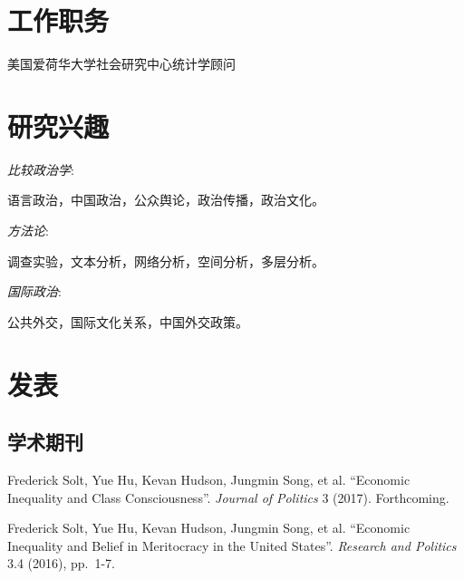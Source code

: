 \documentclass[10.5pt,]{article}
\providecommand{\tightlist}{%
  \setlength{\itemsep}{0pt}\setlength{\parskip}{0pt}}
\renewenvironment{itemize}{
  \begin{list}{}{
    \setlength{\leftmargin}{1.5em}
  }
}{
  \end{list}
}
\begin{document}
\section{工作职务}

\begin{itemize}
\tightlist
\item
  美国爱荷华大学社会研究中心统计学顾问
\end{itemize}

\section{研究兴趣}

\begin{itemize}
\tightlist
\item
  \emph{比较政治学}:

  \begin{itemize}
  \tightlist
  \item
    语言政治，中国政治，公众舆论，政治传播，政治文化。
  \end{itemize}
\item
  \emph{方法论}:

  \begin{itemize}
  \tightlist
  \item
    调查实验，文本分析，网络分析，空间分析，多层分析。
  \end{itemize}
\item
  \emph{国际政治}:

  \begin{itemize}
  \tightlist
  \item
    公共外交，国际文化关系，中国外交政策。
  \end{itemize}
\end{itemize}

\section{发表}

\subsection{学术期刊}

Frederick Solt, Yue Hu, Kevan Hudson, Jungmin Song, et al. ``Economic
Inequality and Class Consciousness''. \emph{Journal of Politics} 3
(2017). Forthcoming.

Frederick Solt, Yue Hu, Kevan Hudson, Jungmin Song, et al. ``Economic
Inequality and Belief in Meritocracy in the United States''.
\emph{Research and Politics} 3.4 (2016), pp.~1-7.
\end{document}
